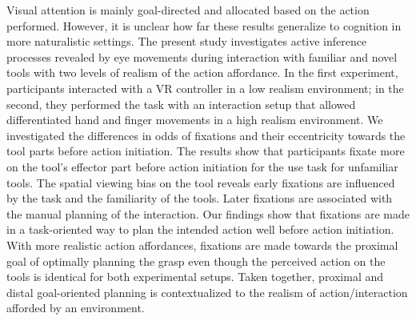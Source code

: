 Visual attention is mainly goal-directed and allocated based on the action performed. However, it is unclear how far these results generalize to cognition in more naturalistic settings. The present study investigates active inference processes revealed by eye movements during interaction with familiar and novel tools with two levels of realism of the action affordance. In the first experiment, participants interacted with a VR controller in a low realism environment; in the second, they performed the task with an interaction setup that allowed differentiated hand and finger movements in a high realism environment. We investigated the differences in odds of fixations and their eccentricity towards the tool parts before action initiation. The results show that participants fixate more on the tool’s effector part before action initiation for the use task for unfamiliar tools. The spatial viewing bias on the tool reveals early fixations are influenced by the task and the familiarity of the tools. Later fixations are associated with the manual planning of the interaction. Our findings show that fixations are made in a task-oriented way to plan the intended action well before action initiation. With more realistic action affordances, fixations are made towards the proximal goal of optimally planning the grasp even though the perceived action on the tools is identical for both experimental setups. Taken together, proximal and distal goal-oriented planning is contextualized to the realism of action/interaction afforded by an environment.


